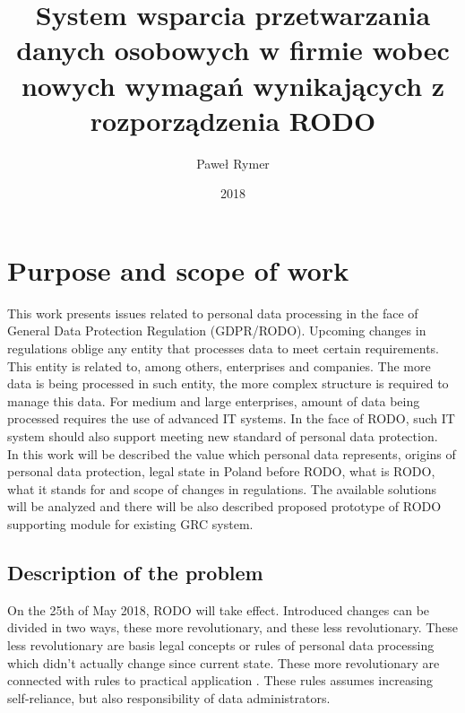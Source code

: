 \documentclass[en, noamssymb]{mgr}
\title{System wsparcia przetwarzania danych osobowych
w firmie wobec nowych wymagań wynikających z rozporządzenia RODO}
\author{Paweł Rymer}
\date{2018} %
\begin{document}

\maketitle %

\tableofcontents %

\chapter{Purpose and scope of work} \label{sec:sekcjaWprowadzenie}



This work presents issues related to personal data processing in the face of General Data Protection Regulation (GDPR/RODO). Upcoming changes in regulations oblige any entity that processes data to meet certain requirements. This entity is related to, among others, enterprises and companies. The more data is being processed in such entity, the more complex structure is required to manage this data. For medium and large enterprises, amount of data being processed requires the use of advanced IT systems. In the face of RODO, such IT system should also support meeting new standard of personal data protection.\\
\indent In this work will be described the value which personal data represents,  origins of personal data protection, legal state in Poland before RODO, what is RODO, what it stands for and scope of changes in regulations. The available solutions will be analyzed and there will be also described proposed prototype of RODO supporting module for existing GRC system.

\section{Description of the problem}

On the 25th of May 2018, RODO will take effect. Introduced changes can be divided in two ways, these more revolutionary, and these less revolutionary. These less revolutionary are basis legal concepts or rules of personal data processing which didn't actually change since current state. These more revolutionary are connected with rules to practical application \cite{giodo}. These rules assumes increasing self-reliance, but also responsibility of data administrators.\\
\end{document}
